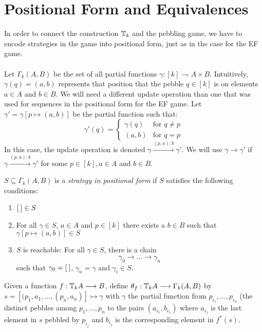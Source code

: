 \section{Positional Form and Equivalences}\label{sec:positionalFormP}
In order to connect the construction ${\mathbb{T}_{k}}$ and the pebbling game, we have to encode strategies in the game into positional form, just as in the case for the EF game. \\~\\
Let $\Gamma_{k}(A,B)$ be the set of all partial functions $\gamma:[k] \rightharpoondown A \times B$. Intuitively, $\gamma(q) = (a,b)$ represents that position that the pebble $q \in [k]$ is on elements $a \in A$ and $b \in B$. We will need a different update operation than one that was used for sequences in the positional form for the EF game. Let $\gamma' = \gamma[p \mapsto (a,b)]$ be the partial function such that:  
\begin{equation*}
\gamma'(q) = \begin{cases}
                \gamma(q) & \text{for } q \not= p \\
                (a,b) & \text{for } q = p 
            \end{cases}
\end{equation*}
In this case, the update operation is denoted $\gamma \xrightarrow{(p,a):b} \gamma'$. We will use $\gamma \longrightarrow \gamma'$ if $\gamma \xrightarrow{(p,a):b} \gamma'$ for some $p \in [k], a \in A$ and $b \in B$.
\begin{defn}
$S \subseteq \Gamma_{k}(A,B)$ is a \textit{strategy in positional form} if $S$ satisfies the following conditions:
\begin{enumerate}[label=(S\arabic*),ref=S\arabic*,start=0]
\item ${[\:]} \in S$ \label{eq:S1st}
\item For all $\gamma \in S$, $a \in A$ and $p \in [k]$ there exists a $b \in B$ such that $\gamma[p \mapsto (a,b)] \in S$ \label{eq:S2nd}
\item $S$ is reachable: For all $\gamma \in S$, there is a chain \label{eq:S3rd}
$$\gamma_{0} \longrightarrow \dots \longrightarrow \gamma_{n}$$
such that $\gamma_{0} = {[\:]}$, $\gamma_{n} = \gamma$ and $\gamma_{i} \in S$. 
\end{enumerate}
\end{defn}
Given a function $f:{\mathbb{T}_{k}A} \longrightarrow B$, define $\theta_{f}:{\mathbb{T}_{k}A} \longrightarrow \Gamma_{k}(A,B)$ by $s = [(p_{1},a_{1},\dots,(p_{n},a_{n})] \mapsto \gamma$ with $\gamma$ the partial function from $p_{i_{1}},\dots,p_{i_{n}}$ (the distinct pebbles among $p_{1},\dots,p_{n}$ to the pairs $(a_{i_{1}},b_{i_{1}})$ where $a_{i_{j}}$ is the last element in $s$ pebbled by $p_{i_{j}}$ and $b_{i_{j}}$ is the corresponding element in $f^{*}(s)$. 
